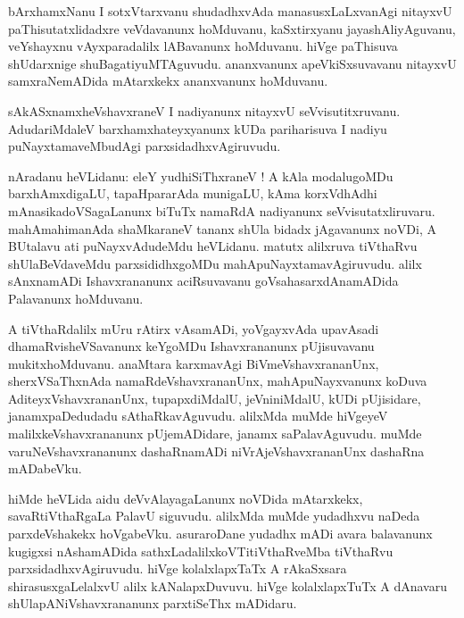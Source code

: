 \documentclass{article}
\begin{document}
\begin{mn}
bArxhamxNanu I sotxVtarxvanu shudadhxvAda manasusxLaLxvanAgi nitayxvU paThisutatxlidadxre
veVdavanunx hoMduvanu, kaSxtirxyanu jayashAliyAguvanu, veYshayxnu vAyxparadalilx lABavanunx 
hoMduvanu. hiVge paThisuva shUdarxnige shuBagatiyuMTAguvudu. ananxvanunx apeVkiSxsuvavanu 
nitayxvU samxraNemADida mAtarxkekx ananxvanunx hoMduvanu.
\end{mn}

\begin{mn}
sAkASxnamxheVshavxraneV I nadiyanunx nitayxvU seVvisutitxruvanu. AdudariMdaleV 
barxhamxhateyxyanunx kUDa pariharisuva I nadiyu puNayxtamaveMbudAgi parxsidadhxvAgiruvudu.
\end{mn}


\begin{mn}
nAradanu heVLidanu: eleY yudhiSiThxraneV ! A kAla modalugoMDu  barxhAmxdigaLU, tapaHpararAda 
munigaLU, kAma korxVdhAdhi mAnasikadoVSagaLanunx biTuTx namaRdA nadiyanunx seVvisutatxliruvaru. 
mahAmahimanAda shaMkaraneV tananx shUla bidadx jAgavanunx noVDi, A BUtalavu ati puNayxvAdudeMdu
heVLidanu. matutx alilxruva tiVthaRvu shUlaBeVdaveMdu parxsididhxgoMDu mahApuNayxtamavAgiruvudu.
alilx sAnxnamADi Ishavxrananunx aciRsuvavanu goVsahasarxdAnamADida Palavanunx hoMduvanu.
\end{mn}

\begin{mn}
A tiVthaRdalilx mUru rAtirx vAsamADi, yoVgayxvAda upavAsadi dhamaRvisheVSavanunx keYgoMDu 
Ishavxrananunx pUjisuvavanu mukitxhoMduvanu. anaMtara karxmavAgi BiVmeVshavxrananUnx, 
sherxVSaThxnAda namaRdeVshavxrananUnx, mahApuNayxvanunx koDuva AditeyxVshavxrananUnx, 
tupapxdiMdalU, jeVniniMdalU, kUDi pUjisidare, janamxpaDedudadu sAthaRkavAguvudu. alilxMda muMde
hiVgeyeV malilxkeVshavxrananunx pUjemADidare, janamx saPalavAguvudu. muMde varuNeVshavxrananunx
dashaRnamADi niVrAjeVshavxrananUnx dashaRna mADabeVku. 
\end{mn}

\begin{mn}
hiMde heVLida aidu deVvAlayagaLanunx noVDida mAtarxkekx, savaRtiVthaRgaLa PalavU siguvudu. 
alilxMda muMde yudadhxvu naDeda parxdeVshakekx hoVgabeVku. asuraroDane yudadhx mADi avara 
balavanunx kugigxsi nAshamADida sathxLadalilxkoVTitiVthaRveMba tiVthaRvu parxsidadhxvAgiruvudu. 
hiVge kolalxlapxTaTx A rAkaSxsara shirasusxgaLelalxvU alilx kANalapxDuvuvu. hiVge kolalxlapxTuTx 
A dAnavaru shUlapANiVshavxrananunx  parxtiSeThx mADidaru.
\end{mn}
\end{document}
